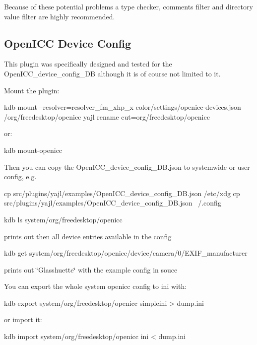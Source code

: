 Because of these potential problems a type checker, comments filter and directory value filter are highly recommended.

\subsection*{Open\+I\+C\+C Device Config}

This plugin was specifically designed and tested for the {\ttfamily Open\+I\+C\+C\+\_\+device\+\_\+config\+\_\+\+D\+B} although it is of course not limited to it.

Mount the plugin\+: \begin{DoxyVerb}kdb mount --resolver=resolver_fm_xhp_x color/settings/openicc-devices.json /org/freedesktop/openicc yajl rename cut=org/freedesktop/openicc
\end{DoxyVerb}


or\+: \begin{DoxyVerb}kdb mount-openicc
\end{DoxyVerb}


Then you can copy the Open\+I\+C\+C\+\_\+device\+\_\+config\+\_\+\+D\+B.\+json to systemwide or user config, e.\+g. \begin{DoxyVerb}cp src/plugins/yajl/examples/OpenICC_device_config_DB.json /etc/xdg
cp src/plugins/yajl/examples/OpenICC_device_config_DB.json ~/.config

kdb ls system/org/freedesktop/openicc
\end{DoxyVerb}


prints out then all device entries available in the config \begin{DoxyVerb}kdb get system/org/freedesktop/openicc/device/camera/0/EXIF_manufacturer
\end{DoxyVerb}


prints out \char`\"{}\+Glasshuette\char`\"{} with the example config in souce

You can export the whole system openicc config to ini with\+: \begin{DoxyVerb}kdb export system/org/freedesktop/openicc simpleini > dump.ini
\end{DoxyVerb}


or import it\+: \begin{DoxyVerb}kdb import system/org/freedesktop/openicc ini < dump.ini\end{DoxyVerb}
 